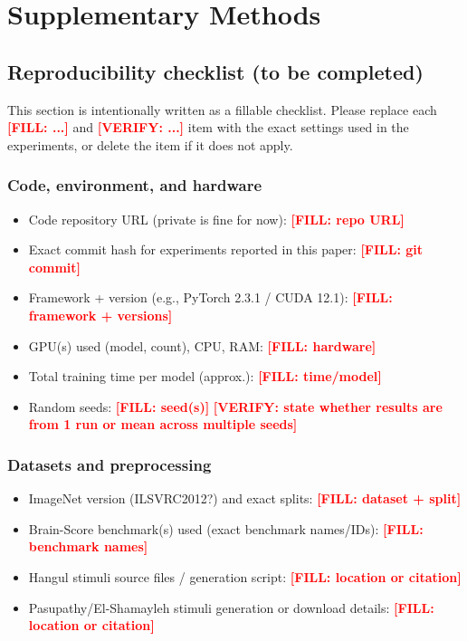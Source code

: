 \documentclass[pdflatex,sn-nature]{sn-jnl}
\newcommand{\FILL}[1]{\textcolor{red}{\textbf{[FILL: #1]}}}
\newcommand{\VERIFY}[1]{\textcolor{red}{\textbf{[VERIFY: #1]}}}
\begin{document}
\section{Supplementary Methods}


\subsection{Reproducibility checklist (to be completed)}
\label{sec:sup_repro}

This section is intentionally written as a fillable checklist. Please replace each \FILL{...} and \VERIFY{...} item with the exact settings used in the experiments, or delete the item if it does not apply.

\subsubsection*{Code, environment, and hardware}
\begin{itemize}
    \item Code repository URL (private is fine for now): \FILL{repo URL}
    \item Exact commit hash for experiments reported in this paper: \FILL{git commit}
    \item Framework + version (e.g., PyTorch 2.3.1 / CUDA 12.1): \FILL{framework + versions}
    \item GPU(s) used (model, count), CPU, RAM: \FILL{hardware}
    \item Total training time per model (approx.): \FILL{time/model}
    \item Random seeds: \FILL{seed(s)} \quad \VERIFY{state whether results are from 1 run or mean across multiple seeds}
\end{itemize}

\subsubsection*{Datasets and preprocessing}
\begin{itemize}
    \item ImageNet version (ILSVRC2012?) and exact splits: \FILL{dataset + split}
    \item Brain-Score benchmark(s) used (exact benchmark names/IDs): \FILL{benchmark names}
    \item Hangul stimuli source files / generation script: \FILL{location or citation}
    \item Pasupathy/El-Shamayleh stimuli generation or download details: \FILL{location or citation}
\end{itemize}
\end{document}
